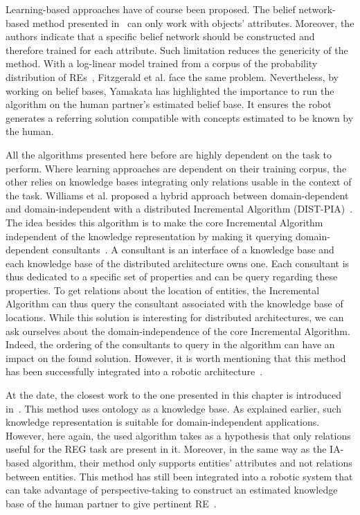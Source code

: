 Learning-based approaches have of course been proposed. The belief network-based method presented in~\cite{yamakata_2004_belief} can only work with objects' attributes. Moreover, the authors indicate that a specific belief network should be constructed and therefore trained for each attribute. Such limitation reduces the genericity of the method. With a log-linear model trained from a corpus of the probability distribution of REs~\cite{fitzgerald_2013_learning}, Fitzgerald et al. face the same problem. Nevertheless, by working on belief bases, Yamakata has highlighted the importance to run the algorithm on the human partner's estimated belief base. It ensures the robot generates a referring solution compatible with concepts estimated to be known by the human.

All the algorithms presented here before are highly dependent on the task to perform. Where learning approaches are dependent on their training corpus, the other relies on knowledge bases integrating only relations usable in the context of the task. Williams et al. proposed a hybrid approach between domain-dependent and domain-independent with a distributed Incremental Algorithm (DIST-PIA)~\cite{williams_2017_referring}. The idea besides this algorithm is to make the core Incremental Algorithm independent of the knowledge representation by making it querying domain-dependent consultants~\cite{williams_2016_framework}. A consultant is an interface of a knowledge base and each knowledge base of the distributed architecture owns one. Each consultant is thus dedicated to a specific set of properties and can be query regarding these properties. To get relations about the location of entities, the Incremental Algorithm can thus query the consultant associated with the knowledge base of locations. While this solution is interesting for distributed architectures, we can ask ourselves about the domain-independence of the core Incremental Algorithm. Indeed, the ordering of the consultants to query in the algorithm can have an impact on the found solution. However, it is worth mentioning that this method has been successfully integrated into a robotic architecture~\cite{williams_2019_dempster}.

At the date, the closest work to the one presented in this chapter is introduced in~\cite{ros_2010_which}. This method uses ontology as a knowledge base. As explained earlier, such knowledge representation is suitable for domain-independent applications. However, here again, the used algorithm takes as a hypothesis that only relations useful for the REG task are present in it. Moreover, in the same way as the IA-based algorithm, their method only supports entities' attributes and not relations between entities. This method has still been integrated into a robotic system that can take advantage of perspective-taking to construct an estimated knowledge base of the human partner to give pertinent RE~\cite{lemaignan_2011_grounding}.

